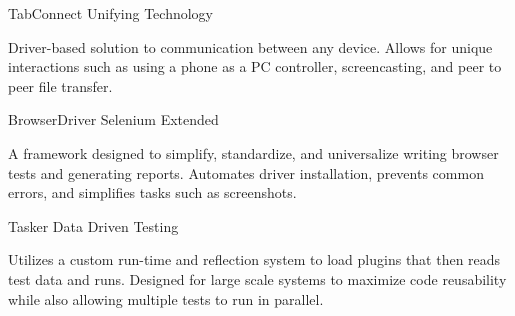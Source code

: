 \vspace{-5mm}

\begin{cventries}
  \cventry%
    {} %
    {TabConnect}
    {Unifying Technology} %
    {} %
    {
      \vspace{-5mm}
      \begin{cvitems}
        \item {Driver-based solution to communication between any device. %
        Allows for unique interactions such as using a phone as a PC controller, %
        screencasting, and peer to peer file transfer.}
      \end{cvitems}
    }
  \cventry%
    {} %
    {BrowserDriver}
    {Selenium Extended} %
    {} %
    {
      \vspace{-5mm}
      \begin{cvitems}
        \item {A framework designed to simplify, standardize, and universalize %
        writing browser tests and generating reports. Automates driver installation, %
        prevents common errors, and simplifies tasks such as screenshots.}
      \end{cvitems}
    }
    \cventry%
    {} %
    {Tasker}
    {Data Driven Testing} %
    {} %
    {
      \vspace{-5mm}
      \begin{cvitems}
        \item {Utilizes a custom run-time and reflection system to load plugins %
        that then reads test data and runs. Designed for large scale systems %
        to maximize code reusability while also allowing multiple tests to run in parallel.}
      \end{cvitems}
    }
\end{cventries}
\vspace{-5mm}
